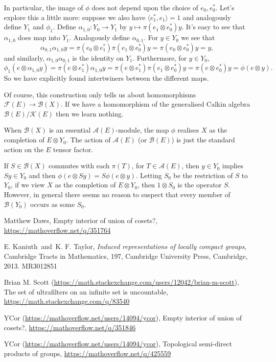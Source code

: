 \documentclass[twoside,a4paper,12pt]{article}
\theoremstyle{plain}
\theoremstyle{definition}
\newcommand{\ip}[2]{\langle #1,#2 \rangle}
\newcommand{\mc}{\mathcal}
\begin{document}
In particular, the image of $\phi$ does not depend upon the choice of $e_0, e_0^*$.  Let's explore this a little more: suppose we also have $\ip{e_1^*}{e_1} = 1$ and analogously define $Y_1$ and $\phi_1$.  Define $\alpha_{1,0} \colon Y_0 \to Y_1$ by $y \mapsto \pi(e_1\otimes e_0^*)y$.  It's easy to see that $\alpha_{1,0}$ does map into $Y_1$.  Analogously define $\alpha_{0,1}$.  For $y\in Y_0$ we see that
\[ \alpha_{0,1} \alpha_{1,0} y = \pi(e_0\otimes e_1^*)\pi(e_1\otimes e_0^*)y
= \pi(e_0\otimes e_0^*)y = y, \]
and similarly, $\alpha_{1,0} \alpha_{0,1}$ is the identity on $Y_1$.  Furthermore, for $y\in Y_0$,
\[ \phi_1(e \otimes \alpha_{1,0}y)
= \pi(e\otimes e_1^*) \alpha_{1,0}y
= \pi(e\otimes e_1^*) \pi(e_1\otimes e_0^*) y
= \pi(e\otimes e_0^*) y = \phi(e\otimes y). \]
So we have explicitly found intertwiners between the different maps.

Of course, this construction only tells us about homomorphisms $\mc F(E) \to \mc B(X)$.  If we have a homomorphism of the generalised Calkin algebra $\mc B(E) / \mc K(E)$ then we learn nothing.

When $\mc B(X)$ is an essential $\mc A(E)$-module, the map $\phi$ realises $X$ as the completion of $E \otimes Y_0$.  The action of $\mc A(E)$ (or $\mc B(E)$) is just the standard action on the $E$ tensor factor.

If $S\in\mc B(X)$ commutes with each $\pi(T)$, for $T\in\mc A(E)$, then $y\in Y_0$ implies $Sy\in Y_0$ and then $\phi(e\otimes Sy) = S\phi(e\otimes y)$.  Letting $S_0$ be the restriction of $S$ to $Y_0$, if we view $X$ as the completion of $E\otimes Y_0$, then $1\otimes S_0$ is the operator $S$.  However, in general there seems no reason to suspect that every member of $\mc B(Y_0)$ occurs as some $S_0$.




\begin{thebibliography}{aa}

 Matthew Daws, Empty interior of union of cosets?, 
   \url{https://mathoverflow.net/q/351764}

 E. Kaniuth\ and\ K. F. Taylor, {\it Induced representations of locally compact groups}, Cambridge Tracts in Mathematics, 197, Cambridge University Press, Cambridge, 2013. MR3012851

 Brian M. Scott (\url{https://math.stackexchange.com/users/12042/brian-m-scott}), The set of ultrafilters on an infinite set is uncountable, \url{https://math.stackexchange.com/q/83540}

 YCor (\url{https://mathoverflow.net/users/14094/ycor}), Empty interior of union of cosets?,
   \url{https://mathoverflow.net/q/351846}

 YCor (\url{https://mathoverflow.net/users/14094/ycor}), Topological semi-direct products of groups,
   \url{https://mathoverflow.net/q/425559}

\end{thebibliography}
\end{document}
